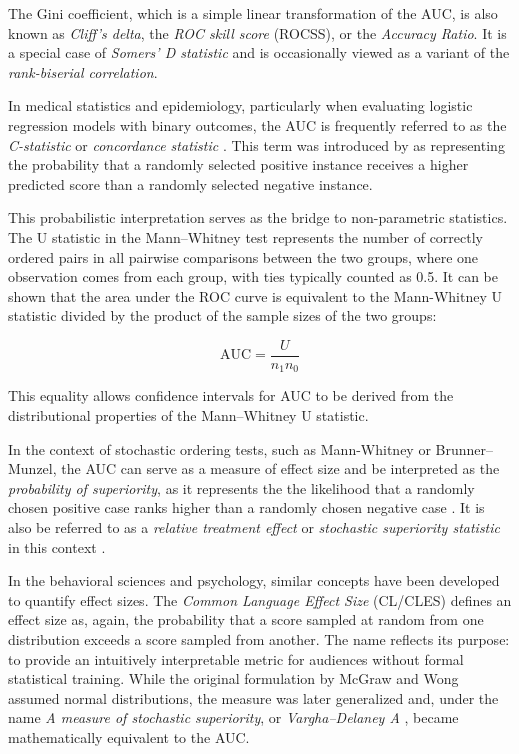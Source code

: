 The Gini coefficient, which is a simple linear transformation of the
AUC, is also known as \emph{Cliff's delta}, the \emph{ROC skill score} (ROCSS), or
the \emph{Accuracy Ratio}. It is a special case of \emph{Somers' D statistic} and
is occasionally viewed as a variant of the \emph{rank-biserial correlation}.

In medical statistics and epidemiology, particularly when evaluating
logistic regression models with binary outcomes, the AUC is frequently
referred to as the \emph{C-statistic} or \emph{concordance statistic}
\citep{Austin_Steyerberg_2012}. This term was introduced by
\citet{Harrell_Califf_Pryor_Lee_Rosati_1982} as representing the probability
that a randomly selected positive instance receives a higher predicted
score than a randomly selected negative instance.

This probabilistic interpretation serves as the bridge to non-parametric
statistics. The U statistic in the Mann--Whitney test represents the
number of correctly ordered pairs in all pairwise comparisons between
the two groups, where one observation comes from each group, with ties
typically counted as 0.5. It can be shown that the area under the ROC
curve is equivalent to the Mann-Whitney U statistic divided by the
product of the sample sizes of the two groups:

\[\text{AUC} = \frac{U}{n_1  n_0}\]

This equality allows confidence intervals for AUC to be derived from the
distributional properties of the Mann--Whitney U statistic.

In the context of stochastic ordering tests, such as Mann-Whitney or
Brunner--Munzel, the AUC can serve as a measure of effect size and be
interpreted as the \emph{probability of superiority}, as it represents the
the likelihood that a randomly chosen positive case ranks higher than a
randomly chosen negative case \citep{Hanley_McNeil_1982, Bamber_1975}. It is
also be referred to as a \emph{relative treatment effect} or \emph{stochastic
superiority statistic} in this context \citep{Brunner_Munzel_2000, Karch_2021}.

In the behavioral sciences and psychology, similar concepts have been
developed to quantify effect sizes. The \emph{Common Language Effect Size}
(CL/CLES) \citep{McGraw_Wong_1992} defines an effect size as, again, the
probability that a score sampled at random from one distribution exceeds
a score sampled from another. The name reflects its purpose: to provide
an intuitively interpretable metric for audiences without formal
statistical training. While the original formulation by McGraw and Wong
assumed normal distributions, the measure was later generalized and,
under the name \emph{A measure of stochastic superiority}, or \emph{Vargha--Delaney
A} \citep{Vargha_Delaney_2000}, became mathematically equivalent to the AUC.

